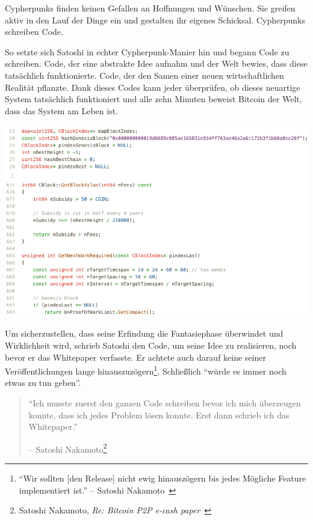 Cypherpunks finden keinen Gefallen an Hoffnungen und Wünschen. Sie greifen aktiv
in den Lauf der Dinge ein und gestalten ihr eigenes Schicksal. Cypherpunks
schreiben Code.

So setzte sich Satoshi in echter Cypherpunk-Manier hin und begann Code zu
schreiben. Code, der eine abstrakte Idee aufnahm und der Welt bewies, dass diese
tatsächlich funktionierte. Code, der den Samen einer neuen wirtschaftlichen
Realität pflanzte. Dank dieses Codes kann jeder überprüfen, ob dieses neuartige
System tatsächlich funktioniert und alle zehn Minuten beweist Bitcoin der Welt,
dass das System am Leben ist.

\begin{center}
  \includegraphics[width=\textwidth]{assets/images/bitcoin-code-white.png}
  \caption{Code-Auszüge aus der Bitcoin Version 0.1}
  \label{fig:bitcoin-code-white}
\end{center}

Um sicherzustellen, dass seine Erfindung die Fantasiephase überwindet und
Wirklichkeit wird, schrieb Satoshi den Code, um seine Idee zu realisieren, noch
bevor er das Whitepaper verfasste. Er achtete auch darauf keine seiner
Veröffentlichungen lange hinauszuzögern\footnote{\enquote{Wir sollten [den
Release] nicht ewig hinauszögern bis jedes Mögliche Feature implementiert ist.}
-- Satoshi Nakamoto~\cite{satoshi-delay}}. Schließlich \enquote{würde es immer
noch etwas zu tun geben}.

\begin{quotation}\begin{samepage}
\enquote{Ich musste zuerst den ganzen Code schreiben bevor ich mich überzeugen konnte, dass ich jedes Problem lösen konnte.
Erst dann schrieb ich das Whitepaper.}
\begin{flushright} -- Satoshi Nakamoto\footnote{Satoshi Nakamoto, \textit{Re: Bitcoin P2P e-cash paper}~\cite{satoshi-mail-code-first}}
\end{flushright}\end{samepage}\end{quotation}

